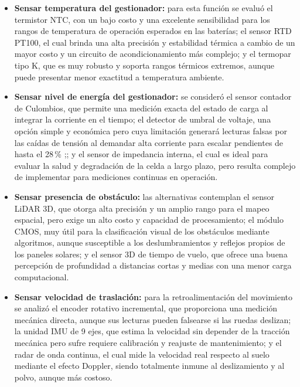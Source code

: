 \documentclass[../../General.tex]{subfiles}
\begin{document}
\begin{itemize}
	\item \textbf{Sensar temperatura del gestionador:} para esta función se evaluó el termistor NTC, con un bajo costo y una excelente sensibilidad para los rangos de temperatura de operación esperados en las baterías; el sensor RTD PT100, el cual brinda una alta precisión y estabilidad térmica a cambio de un mayor costo y un circuito de acondicionamiento más complejo; y el termopar tipo K, que es muy robusto y soporta rangos térmicos extremos, aunque puede presentar menor exactitud a temperatura ambiente.
	
	\item \textbf{Sensar nivel de energía del gestionador:} se consideró el sensor contador de Culombios, que permite una medición exacta del estado de carga al integrar la corriente en el tiempo; el detector de umbral de voltaje, una opción simple y económica pero cuya limitación generará lecturas falsas por las caídas de tensión al demandar alta corriente para escalar pendientes de hasta el 28\,\% \citep{Salinas2025};; y el sensor de impedancia interna, el cual es ideal para evaluar la salud y degradación de la celda a largo plazo, pero resulta complejo de implementar para mediciones continuas en operación.
	
	\item \textbf{Sensar presencia de obstáculo:} las alternativas contemplan el sensor LiDAR 3D, que otorga alta precisión y un amplio rango para el mapeo espacial, pero exige un alto costo y capacidad de procesamiento; el módulo CMOS, muy útil para la clasificación visual de los obstáculos mediante algoritmos, aunque susceptible a los deslumbramientos y reflejos propios de los paneles solares; y el sensor 3D de tiempo de vuelo, que ofrece una buena percepción de profundidad a distancias cortas y medias con una menor carga computacional.
	
	\item \textbf{Sensar velocidad de traslación:} para la retroalimentación del movimiento se analizó el encoder rotativo incremental, que proporciona una medición mecánica directa, aunque sus lecturas pueden falsearse si las ruedas deslizan; la unidad IMU de 9 ejes, que estima la velocidad sin depender de la tracción mecánica pero sufre requiere calibración y reajuste de mantenimiento; y el radar de onda continua, el cual mide la velocidad real respecto al suelo mediante el efecto Doppler, siendo totalmente inmune al deslizamiento y al polvo, aunque más costoso.
	

\end{itemize}
\end{document}
